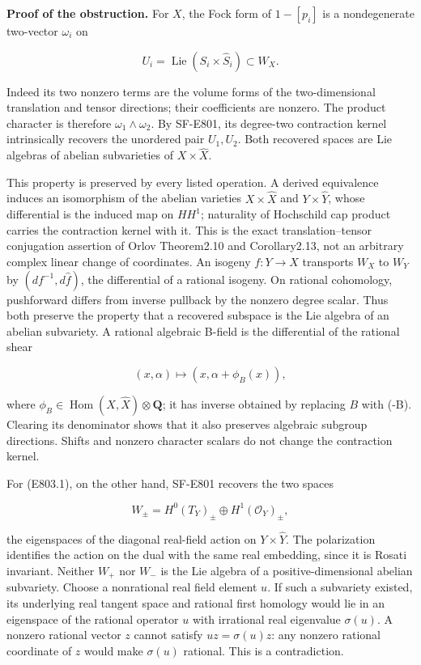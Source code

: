 \textbf{Proof of the obstruction.} For \(X\), the Fock form of
\(1-[p_i]\) is a nondegenerate two-vector \(\omega_i\) on

\[
 U_i=\operatorname{Lie}(S_i\times\widehat S_i)
       \subset W_X.
\]

Indeed its two nonzero terms are the volume forms of the two-dimensional
translation and tensor directions; their coefficients are nonzero. The
product character is therefore \(\omega_1\wedge\omega_2\). By SF-E801,
its degree-two contraction kernel intrinsically recovers the unordered
pair \(U_1,U_2\). Both recovered spaces are Lie algebras of abelian
subvarieties of \(X\times\widehat X\).

This property is preserved by every listed operation. A derived
equivalence induces an isomorphism of the abelian varieties
\(X\times\widehat X\) and \(Y\times\widehat Y\), whose differential is
the induced map on \(HH^1\); naturality of Hochschild cap product
carries the contraction kernel with it. This is the exact
translation--tensor conjugation assertion of Orlov Theorem2.10 and
Corollary2.13, not an arbitrary complex linear change of coordinates. An
isogeny \(f:Y\to X\) transports \(W_X\) to \(W_Y\) by
\((df^{-1},d\widehat f)\), the differential of a rational isogeny. On
rational cohomology, pushforward differs from inverse pullback by the
nonzero degree scalar. Thus both preserve the property that a recovered
subspace is the Lie algebra of an abelian subvariety. A rational
algebraic B-field is the differential of the rational shear

\[
 (x,\alpha)\longmapsto(x,\alpha+\phi_B(x)),
\]

where \(\phi_B\in\operatorname{Hom}(X,\widehat X)\otimes\mathbf Q\); it
has inverse obtained by replacing \(B\) with (-B). Clearing its
denominator shows that it also preserves algebraic subgroup directions.
Shifts and nonzero character scalars do not change the contraction
kernel.

For (E803.1), on the other hand, SF-E801 recovers the two spaces

\[
 W_\pm=H^0(T_Y)_\pm\oplus H^1(\mathcal O_Y)_\pm,
\]

the eigenspaces of the diagonal real-field action on
\(Y\times\widehat Y\). The polarization identifies the action on the
dual with the same real embedding, since it is Rosati invariant. Neither
\(W_+\) nor \(W_-\) is the Lie algebra of a positive-dimensional abelian
subvariety. Choose a nonrational real field element \(u\). If such a
subvariety existed, its underlying real tangent space and rational first
homology would lie in an eigenspace of the rational operator \(u\) with
irrational real eigenvalue \(\sigma(u)\). A nonzero rational vector
\(z\) cannot satisfy \(uz=\sigma(u)z\): any nonzero rational coordinate
of \(z\) would make \(\sigma(u)\) rational. This is a contradiction.

